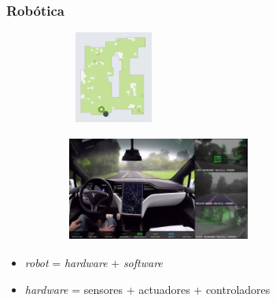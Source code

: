 \documentclass[xcolor={table}]{beamer}
\begin{document}
		
		\begin{frame}
		\frametitle{Robótica}
        \begin{figure}[H]
        \centering
        \begin{subfigure}{\textwidth}
            \includegraphics[width=3cm, height=3cm]{img/roomba.png}
        \label{fig:roomba}
        \end{subfigure}\hfill
        \begin{subfigure}{\textwidth}
            \includegraphics[width=6cm, height=3.5cm]{img/tesla.jpg}
        \label{fig:tesla}
        \end{subfigure}\hfill
        \label{fig:robotica}
        \end{figure}
            \begin{itemize}
                \begin{itemize}
                    \item \textit{robot} = \textit{hardware} + \textit{software}
                    \item \textit{hardware} = sensores + actuadores + controladores
                \end{itemize}            \end{itemize}{}
		\end{frame}
		
\end{document}
